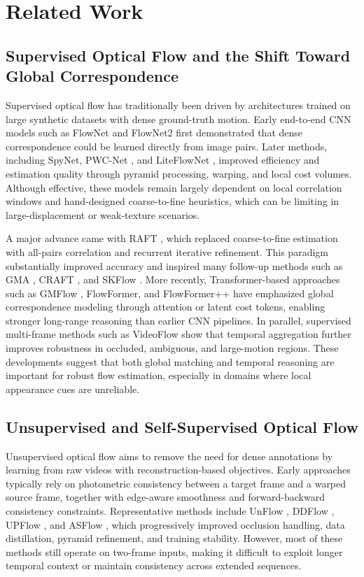 
\section{Related Work}

\subsection{Supervised Optical Flow and the Shift Toward Global Correspondence}

Supervised optical flow has traditionally been driven by architectures trained on large synthetic datasets with dense ground-truth motion. Early end-to-end CNN models such as FlowNet and FlowNet2 \cite{dosovitskiy2015flownet,ilg2017flownet2} first demonstrated that dense correspondence could be learned directly from image pairs. Later methods, including SpyNet, PWC-Net \cite{pwcnet}, and LiteFlowNet \cite{hui2018liteflownet}, improved efficiency and estimation quality through pyramid processing, warping, and local cost volumes. Although effective, these models remain largely dependent on local correlation windows and hand-designed coarse-to-fine heuristics, which can be limiting in large-displacement or weak-texture scenarios.

A major advance came with RAFT \cite{raft}, which replaced coarse-to-fine estimation with all-pairs correlation and recurrent iterative refinement. This paradigm substantially improved accuracy and inspired many follow-up methods such as GMA \cite{gma}, CRAFT \cite{craft}, and SKFlow \cite{skflow}. More recently, Transformer-based approaches such as GMFlow \cite{gmflow}, FlowFormer, and FlowFormer++ \cite{flowformer,flowformerpp} have emphasized global correspondence modeling through attention or latent cost tokens, enabling stronger long-range reasoning than earlier CNN pipelines. In parallel, supervised multi-frame methods such as VideoFlow \cite{videoflow2023} show that temporal aggregation further improves robustness in occluded, ambiguous, and large-motion regions. These developments suggest that both global matching and temporal reasoning are important for robust flow estimation, especially in domains where local appearance cues are unreliable.

\subsection{Unsupervised and Self-Supervised Optical Flow}

Unsupervised optical flow aims to remove the need for dense annotations by learning from raw videos with reconstruction-based objectives. Early approaches typically rely on photometric consistency between a target frame and a warped source frame, together with edge-aware smoothness and forward-backward consistency constraints. Representative methods include UnFlow \cite{unflow}, DDFlow \cite{ddflow}, UPFlow \cite{upflow}, and ASFlow \cite{asflow}, which progressively improved occlusion handling, data distillation, pyramid refinement, and training stability. However, most of these methods still operate on two-frame inputs, making it difficult to exploit longer temporal context or maintain consistency across extended sequences.

